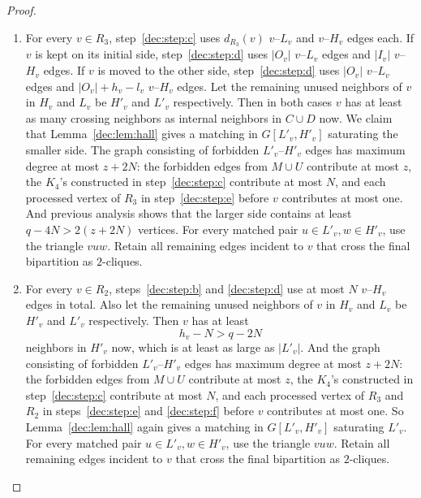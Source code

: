 \documentclass[11pt]{article}
\numberwithin{equation}{section}
\theoremstyle{remark}
\begin{document}
\begin{proof}
\begin{enumerate}[label=\textup{(\alph*)}]
\item For every \(v\in R_3\), step~\ref{dec:step:c} uses \(d_{R_3}(v)\) \(v\)--\(L_v\) and \(v\)--\(H_v\) edges each.
If \(v\) is kept on its initial side, step~\ref{dec:step:d} uses \(|O_v|\) \(v\)--\(L_v\) edges and \(|I_v|\) \(v\)--\(H_v\) edges.
If \(v\) is moved to the other side, step~\ref{dec:step:d} uses \(|O_v|\) \(v\)--\(L_v\) edges and \(|O_v|+h_v-l_v\) \(v\)--\(H_v\) edges.
Let the remaining unused neighbors of \(v\) in \(H_v\) and \(L_v\) be \(H'_v\) and \(L'_v\) respectively.
Then in both cases \(v\) has at least as many crossing neighbors as internal neighbors in \(C\cup D\) now.
We claim that Lemma~\ref{dec:lem:hall} gives a matching in \(G[L'_v,H'_v]\) saturating the smaller side.
The graph consisting of forbidden \(L'_v\)--\(H'_v\) edges has maximum degree at most \(z+2N\):
the forbidden edges from \(M\cup U\) contribute at most \(z\), the \(K_4\)'s constructed in step~\ref{dec:step:c} contribute
at most \(N\), and each processed vertex of \(R_3\) in step~\ref{dec:step:e} before \(v\) contributes at most one.
And previous analysis shows that the larger side contains at least \(q-4N>2(z+2N)\) vertices.
For every matched pair \(u\in L'_v,w\in H'_v\), use the triangle \(vuw\).
Retain all remaining edges incident to \(v\) that cross the final bipartition as \(2\)-cliques.\label{dec:step:e}

\item For every \(v\in R_2\), steps~\ref{dec:step:b} and \ref{dec:step:d} use at most \(N\) \(v\)--\(H_v\) edges in total.
Also let the remaining unused neighbors of \(v\) in \(H_v\) and \(L_v\) be \(H'_v\) and \(L'_v\) respectively.
Then \(v\) has at least
\begin{equation*}
h_v-N>q-2N
\end{equation*}
neighbors in \(H'_v\) now, which is at least as large as \(|L'_v|\). 
And the graph consisting of forbidden \(L'_v\)--\(H'_v\) edges has maximum degree at most \(z+2N\):
the forbidden edges from \(M\cup U\) contribute at most \(z\), the \(K_4\)'s constructed in step~\ref{dec:step:c} contribute
at most \(N\), and each processed vertex of \(R_3\) and \(R_2\) in steps~\ref{dec:step:e} and \ref{dec:step:f}
before \(v\) contributes at most one. So Lemma~\ref{dec:lem:hall} again gives a matching in \(G[L'_v,H'_v]\) saturating \(L'_v\).
For every matched pair \(u\in L'_v,w\in H'_v\), use the triangle \(vuw\).
Retain all remaining edges incident to \(v\) that cross the final bipartition as \(2\)-cliques.\label{dec:step:f}


\end{enumerate}
\end{proof}
\end{document}
